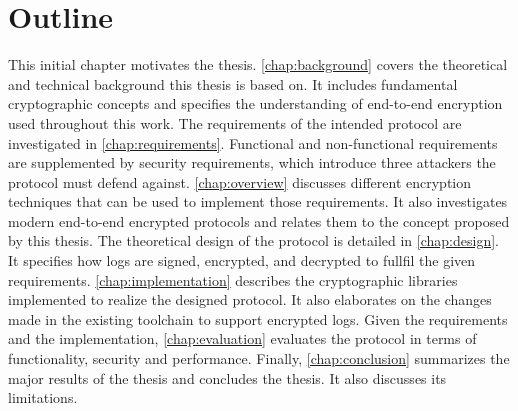 \documentclass[../main.tex]{subfiles}
\begin{document}
\section{Outline}
This initial chapter motivates the thesis.
\cref{chap:background} covers the theoretical and technical background this thesis is based on.
It includes fundamental cryptographic concepts and specifies the understanding of end-to-end encryption used throughout this work.
The requirements of the intended protocol are investigated in \cref{chap:requirements}.
Functional and non-functional requirements are supplemented by security requirements, which introduce three attackers the protocol must defend against.
\cref{chap:overview} discusses different encryption techniques that can be used to implement those requirements.
It also investigates modern end-to-end encrypted protocols and relates them to the concept proposed by this thesis.
The theoretical design of the protocol is detailed in \cref{chap:design}.
It specifies how logs are signed, encrypted, and decrypted to fullfil the given requirements.
\cref{chap:implementation} describes the cryptographic libraries implemented to realize the designed protocol.
It also elaborates on the changes made in the existing toolchain to support encrypted logs.
Given the requirements and the implementation, \cref{chap:evaluation} evaluates the protocol in terms of functionality, security and performance.
Finally, \cref{chap:conclusion} summarizes the major results of the thesis and concludes the thesis. 
It also discusses its limitations.
\end{document}
